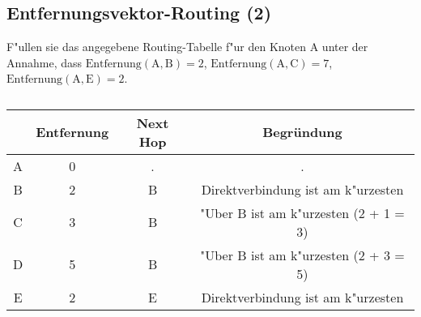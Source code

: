\setcounter{section}{4}
\setcounter{subsection}{24} %
\subsection{Entfernungsvektor-Routing (2)}

F"ullen sie das angegebene Routing-Tabelle f"ur den Knoten A unter der Annahme,
dass $\text{Entfernung}(\text{A}, \text{B}) = 2$, $\text{Entfernung}(\text{A},
\text{C}) = 7$, $\text{Entfernung}(\text{A}, \text{E}) = 2$.

\begin{table}[h]
    \centering
    \begin{tabular}{|c|c|c|c|}
        \hline
          & Entfernung & Next Hop & Begründung\\
        \hline
        A & 0          & .        & . \\
        \hline
        B & 2          & B        & Direktverbindung ist am k"urzesten \\
        \hline
        C & 3          & B        & "Uber B ist am k"urzesten (2 + 1 = 3) \\
        \hline
        D & 5          & B        & "Uber B ist am k"urzesten (2 + 3 = 5) \\
        \hline
        E & 2          & E        & Direktverbindung ist am k"urzesten \\
        \hline
    \end{tabular}
    \caption{}
\end{table}
